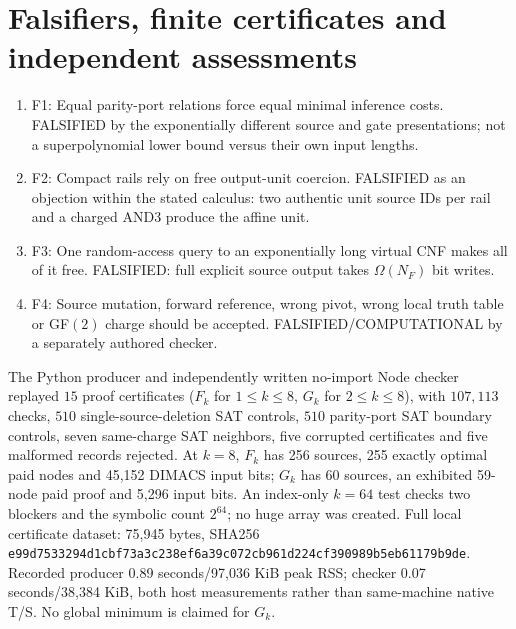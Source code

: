\documentclass[11pt]{article}
\begin{document}
\section*{Falsifiers, finite certificates and independent assessments}
\begin{enumerate}
\item[] F1: Equal parity-port relations force equal minimal inference costs. FALSIFIED by the exponentially different source and gate presentations; not a superpolynomial lower bound versus their own input lengths.
\item[] F2: Compact rails rely on free output-unit coercion. FALSIFIED as an objection within the stated calculus: two authentic unit source IDs per rail and a charged AND3 produce the affine unit.
\item[] F3: One random-access query to an exponentially long virtual CNF makes all of it free. FALSIFIED: full explicit source output takes $\Omega(N_F)$ bit writes.
\item[] F4: Source mutation, forward reference, wrong pivot, wrong local truth table or GF$(2)$ charge should be accepted. FALSIFIED/COMPUTATIONAL by a separately authored checker.
\end{enumerate}
The Python producer and independently written no-import Node checker replayed $15$ proof certificates ($F_k$ for $1\le k\le8$, $G_k$ for $2\le k\le8$), with $107{,}113$ checks, $510$ single-source-deletion SAT controls, $510$ parity-port SAT boundary controls, seven same-charge SAT neighbors, five corrupted certificates and five malformed records rejected. At $k=8$, $F_k$ has 256 sources, 255 exactly optimal paid nodes and 45,152 DIMACS input bits; $G_k$ has 60 sources, an exhibited 59-node paid proof and 5,296 input bits. An index-only $k=64$ test checks two blockers and the symbolic count $2^{64}$; no huge array was created. Full local certificate dataset: 75,945 bytes, SHA256 \texttt{e99d7533294d1cbf73a3c238ef6a39c072cb961d224cf390989b5eb61179b9de}. Recorded producer 0.89 seconds/97,036 KiB peak RSS; checker 0.07 seconds/38,384 KiB, both host measurements rather than same-machine native T/S. No global minimum is claimed for $G_k$.
\end{document}
